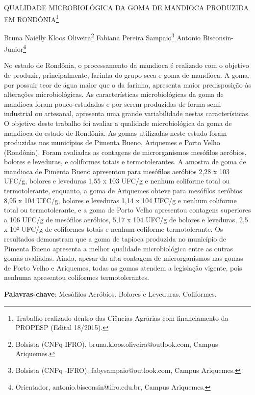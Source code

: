 \documentclass[article,12pt,onesidea,4paper,english,brazil]{abntex2}
\begin{document}
	
	
	\frenchspacing 
	
	\begin{center}
		\LARGE QUALIDADE MICROBIOLÓGICA DA GOMA DE MANDIOCA PRODUZIDA EM RONDÔNIA\footnote{Trabalho realizado dentro das Ciências Agrárias com financiamento da PROPESP (Edital 18/2015).}
		
		\normalsize
		Bruna Naielly Kloos Oliveira\footnote{Bolsista (CNPq-IFRO), bruna.kloos.oliveira@outlook.com, Campus Ariquemes.} 
	Fabiana Pereira Sampaio\footnote{Bolsista (CNPq -IFRO), fabysampaio@outlook.com, Campus Ariquemes.} 
	Antonio Bisconsin-Junior\footnote{Orientador, antonio.bisconsin@ifro.edu.br, Campus Ariquemes.}
	\end{center}
	
	\noindent No estado de Rondônia, o processamento da mandioca é realizado com o objetivo de produzir, principalmente, farinha do grupo seca e goma de mandioca. A goma, por possuir teor de água maior que o da farinha, apresenta maior predisposição às alterações microbiológicas. As características microbiológicas da goma de mandioca foram pouco estudadas e por serem produzidas de forma semi-industrial ou artesanal, apresenta uma grande variabilidade nestas características. O objetivo deste trabalho foi avaliar a qualidade microbiológica da goma de mandioca do estado de Rondônia. As gomas utilizadas neste estudo foram produzidas nos municípios de Pimenta Bueno, Ariquemes e Porto Velho (Rondônia). Foram avaliadas as contagens de microrganismos mesófilos aeróbios, bolores e leveduras, e coliformes totais e termotolerantes. A amostra de goma de mandioca de Pimenta Bueno apresentou para mesófilos aeróbios 2,28 x 103 UFC/g, bolores e leveduras 1,55 x 103 UFC/g e nenhum coliforme total ou termotolerante, enquanto, a goma de Ariquemes obteve para mesófilos aeróbios 8,95 x 104 UFC/g, bolores e leveduras 1,14 x 104 UFC/g e nenhum coliforme total ou termotolerante, e a goma de Porto Velho apresentou contagens superiores a 106 UFC/g de mesófilos aeróbios, 5,17 x 104 UFC/g de bolores e leveduras, 2,5 x 10² UFC/g de coliformes totais e nenhum coliforme termotolerante. Os resultados demonstram que a goma de tapioca produzida no município de Pimenta Bueno apresenta a melhor qualidade microbiológica entre as outras gomas avaliadas. Ainda, apesar da alta contagem de microrganismos nas gomas de Porto Velho e Ariquemes, todas as gomas atendem a legislação vigente, pois nenhuma apresentou coliformes termotolerantes.
	
	\vspace{\onelineskip}
	
	\noindent
	\textbf{Palavras-chave}: Mesófilos Aeróbios. Bolores e Leveduras. Coliformes.
	
\end{document}
